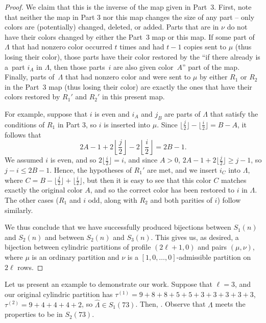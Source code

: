 \documentclass[pdftex]{sigma}
\numberwithin{equation}{section}
\theoremstyle{definition}
\newcommand{\LH}{{\widehat{\Lambda}}}
\begin{document}
\begin{proof}
We claim that this is the inverse of the map given in Part~3. First, note that neither the map in Part 3 nor this map changes the size of any part -- only colors are (potentially) changed, deleted, or added. Parts that are in $\nu$ do not have their colors changed by either the Part~3 map or this map. If some part of $\Lambda$ that had nonzero color occurred $t$ times and had $t-1$ copies sent to $\mu$ (thus losing their color), those parts have their color restored by the ``if there already is a~part $i_A$ in $\Lambda$, then those parts~$i$ are also given color~$A$'' part of the map. Finally, parts of~$\Lambda$ that had nonzero color and were sent to $\mu$ by either $R_1$ or $R_2$ in the Part~3 map (thus losing their color) are exactly the ones that have their colors restored by $R_1'$ and $R_2'$ in this present map.

For example, suppose that $i$ is even and $i_A$ and $j_B$ are parts of $\Lambda$ that satisfy the conditions of $R_1$ in Part 3, so $i$ is inserted into $\mu$. Since $\bigl\lfloor\frac j2\bigr\rfloor-\bigl\lfloor\frac i2\bigr\rfloor=B-A$, it follows that
\begin{equation*}
2A-1+2\left\lfloor\frac j2\right\rfloor-2\left\lfloor\frac i2\right\rfloor=2B-1.
\end{equation*}
We assumed $i$ is even, and so $ 2\bigl\lfloor\frac i2\bigr\rfloor=i$, and since $A>0$, $2A-1+2\bigl\lfloor\frac j2\bigr\rfloor\ge j-1$, so $j-i\le 2B-1$. Hence, the hypotheses of $R_1'$ are met, and we insert $i_C$ into $\Lambda$, where $ C=B-\bigl\lfloor\frac j2\bigr\rfloor+\bigl\lfloor\frac i2\bigr\rfloor$, but then it is easy to see that this color $C$ matches exactly the original color $A$, and so the correct color has been restored to $i$ in $\Lambda$. The other cases ($R_1$ and $i$ odd, along with $R_2$ and both parities of $i$) follow similarly.

We thus conclude that we have successfully produced bijections between $S_1(n)$ and $S_2(n)$ and between $S_2(n)$ and $S_3(n)$. This gives us, as desired, a bijection between cylindric partitions of profile $(2\ell+1,0)$ and pairs $(\mu,\nu)$, where $\mu$ is an ordinary partition and $\nu$ is a $[1,0,\dots,0]$-admissible partition on $2\ell$ rows.
\end{proof}

Let us present an example to demonstrate our work. Suppose that $\ell=3$, and our original cylindric partition \smash{$\LH=\bigl(\tau^{(1)},\tau^{(2)}\bigr)$} has
$\tau^{(1)}=9+8+8+5+5+3+3+3+3+3$,
$\tau^{(2)}=9+4+4+4+2$, so $\LH \in S_1(73)$.
Then,
.
Observe that $\Lambda$ meets the properties to be in $S_2(73)$.
\end{document}
